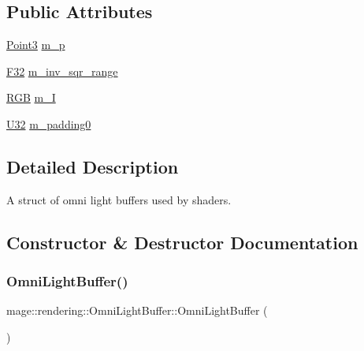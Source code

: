 \subsection*{Public Attributes}
\begin{DoxyCompactItemize}
\item 
\hyperlink{structmage_1_1_point3}{Point3} \hyperlink{structmage_1_1rendering_1_1_omni_light_buffer_aab9cd7c4702a9cba7b47ec49983658d7}{m\+\_\+p}
\item 
\hyperlink{namespacemage_aa97e833b45f06d60a0a9c4fc22ae02c0}{F32} \hyperlink{structmage_1_1rendering_1_1_omni_light_buffer_ac6a0b6050b8d705d46f72ed115b28c4a}{m\+\_\+inv\+\_\+sqr\+\_\+range}
\item 
\hyperlink{structmage_1_1_r_g_b}{R\+GB} \hyperlink{structmage_1_1rendering_1_1_omni_light_buffer_a01b8cc152dd0ea2b961448ad3057a5d0}{m\+\_\+I}
\item 
\hyperlink{namespacemage_a41c104c036fba3756a74e19f793eeaa1}{U32} \hyperlink{structmage_1_1rendering_1_1_omni_light_buffer_a3b440492e1a9fc48c6f109e5787aa4c7}{m\+\_\+padding0}
\end{DoxyCompactItemize}


\subsection{Detailed Description}
A struct of omni light buffers used by shaders. 

\subsection{Constructor \& Destructor Documentation}
\hypertarget{structmage_1_1rendering_1_1_omni_light_buffer_a7429503e161d324c66ecad2250bc69a2}{}\label{structmage_1_1rendering_1_1_omni_light_buffer_a7429503e161d324c66ecad2250bc69a2} 
\subsubsection{\texorpdfstring{Omni\+Light\+Buffer()}{OmniLightBuffer()}\hspace{0.1cm}{\footnotesize\ttfamily [1/3]}}
{\footnotesize\ttfamily mage\+::rendering\+::\+Omni\+Light\+Buffer\+::\+Omni\+Light\+Buffer (\begin{DoxyParamCaption}{ }\end{DoxyParamCaption})\hspace{0.3cm}{\ttfamily [noexcept]}}

